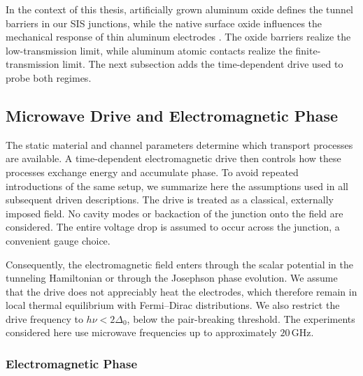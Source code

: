             In the context of this thesis, artificially grown aluminum oxide defines the tunnel barriers in our SIS junctions, while the native surface oxide influences the mechanical response of thin aluminum electrodes \cite{murray_material_2021,saif_effect_2002}. The oxide barriers realize the low-transmission limit, while aluminum atomic contacts realize the finite-transmission limit. The next subsection adds the time-dependent drive used to probe both regimes.
        
    \newpage
    \subsection{Microwave Drive and Electromagnetic Phase}
    \label{subsec:basics:micro-wave}

        The static material and channel parameters determine which transport processes are available. A time-dependent electromagnetic drive then controls how these processes exchange energy and accumulate phase. To avoid repeated introductions of the same setup, we summarize here the assumptions used in all subsequent driven descriptions. The drive is treated as a classical, externally imposed field. No cavity modes or backaction of the junction onto the field are considered. The entire voltage drop is assumed to occur across the junction, a convenient gauge choice.

        Consequently, the electromagnetic field enters through the scalar potential in the tunneling Hamiltonian or through the Josephson phase evolution. We assume that the drive does not appreciably heat the electrodes, which therefore remain in local thermal equilibrium with Fermi--Dirac distributions. We also restrict the drive frequency to $h\nu < 2\Delta_0$, below the pair-breaking threshold. The experiments considered here use microwave frequencies up to approximately $20\,\mathrm{GHz}$. \cite{josephson_possible_1962, shapiro_josephson_1963,tien_multiphoton_1963,werthamer_temperature_1966}

        \subsubsection*{Electromagnetic Phase}

